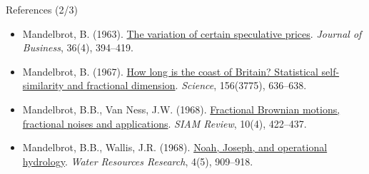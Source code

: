 \begin{frame}{References (2/3)}
\begin{itemize}
    \item Mandelbrot, B. (1963). \href{https://doi.org/10.1086/294632}{The variation of certain speculative prices}. \textit{Journal of Business}, 36(4), 394--419.
    \item Mandelbrot, B. (1967). \href{https://doi.org/10.1126/science.156.3775.636}{How long is the coast of Britain? Statistical self-similarity and fractional dimension}. \textit{Science}, 156(3775), 636--638.
    \item Mandelbrot, B.B., Van Ness, J.W. (1968). \href{https://doi.org/10.1137/1010093}{Fractional Brownian motions, fractional noises and applications}. \textit{SIAM Review}, 10(4), 422--437.
    \item Mandelbrot, B.B., Wallis, J.R. (1968). \href{https://doi.org/10.1029/WR004i005p00909}{Noah, Joseph, and operational hydrology}. \textit{Water Resources Research}, 4(5), 909--918.
\end{itemize}
\end{frame}

